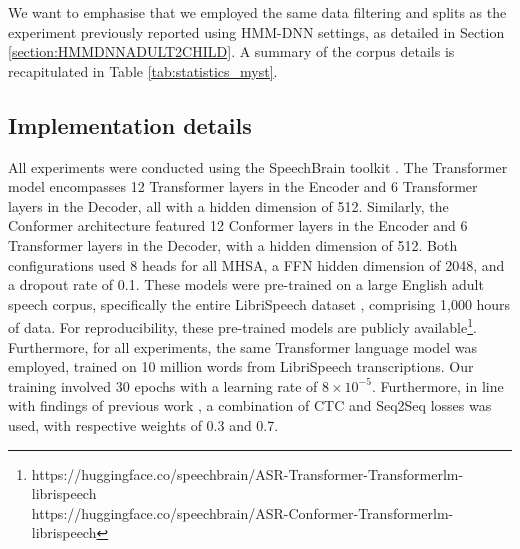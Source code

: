 We want to emphasise that we employed the same data filtering and splits as the experiment previously reported using \ac{HMM-DNN} settings, as detailed in Section \ref{section:HMMDNNADULT2CHILD}. A summary of the corpus details is recapitulated in Table \ref{tab:statistics_myst}.

\subsection{Implementation details}
\label{section:TransformerConformerDetails}
All experiments were conducted using the SpeechBrain toolkit \cite{speechbrain}. The Transformer model encompasses 12 Transformer layers in the Encoder and 6 Transformer layers in the Decoder, all with a hidden dimension of 512. Similarly, the Conformer architecture featured 12 Conformer layers in the Encoder and 6 Transformer layers in the Decoder, with a hidden dimension of 512. Both configurations used 8 heads for all \ac{MHSA}, a \ac{FFN} hidden dimension of 2048, and a dropout rate of 0.1. These models were pre-trained on a large English adult speech corpus, specifically the entire LibriSpeech dataset \cite{librispeech}, comprising 1,000 hours of data. For reproducibility, these pre-trained models are publicly available\footnote{https://huggingface.co/speechbrain/ASR-Transformer-Transformerlm-librispeech\\ https://huggingface.co/speechbrain/ASR-Conformer-Transformerlm-librispeech}. Furthermore, for all experiments, the same Transformer language model was employed, trained on 10 million words from LibriSpeech transcriptions. Our training involved 30 epochs with a learning rate of $8 \times 10^{-5}$. Furthermore, in line with findings of previous work \cite{gelin2021endtoend}, a combination of \ac{CTC} and \ac{Seq2Seq} losses was used, with respective weights of 0.3 and 0.7.

